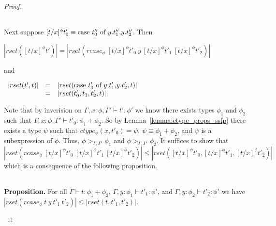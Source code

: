 \begin{proof}
\begin{itemize}
  \ \\
  Next suppose $[t/x]^\phi t'_0 \equiv \mbox{case}\ t''_0\ \text{of}\ y\text{.}t''_1\text{,}y\text{.}t''_2$.  Then 
  \begin{center}
    \begin{math}
      |rset([t/x]^\phi t')| = |rset(rcase_{\phi}\ [t/x]^\phi t'_0\ y\ [t/x]^\phi t'_1\ [t/x]^\phi t'_2)|
    \end{math}
  \end{center}
  and
  \begin{center}
    \begin{math}
      \begin{array}{lll}
        |rset(t', t)| & = & |rset(\mbox{case}\ t'_0\ \text{of}\ y\text{.}t'_1\text{,}y\text{.}t'_2, t)|\\
        & = & |rset(t'_0,t_1,t'_2,t)|.
      \end{array}
    \end{math}
  \end{center}
  Note that by inverision on $\Gamma,x:\phi,\Gamma' \vdash t':\phi'$ we know there exists
  types $\phi_1$ and $\phi_2$ such that $\Gamma,x:\phi,\Gamma' \vdash t'_0:\phi_1+\phi_2$.
  So by Lemma~\ref{lemma:ctype_props_ssfp} there exists a type $\psi$ such that $ctype_\phi (x,t'_0) = \psi$, $\psi \equiv \phi_1+\phi_2$, and $\psi$ is a 
  subexpression of $\phi$. Thus, $\phi >_{\Gamma,\Gamma'} \phi_1$ and $\phi >_{\Gamma,\Gamma'} \phi_2$.
  It suffices to show that $|rset(rcase_\phi\ [t/x]^\phi t'_0\ [t/x]^\phi t'_1\ [t/x]^\phi t'_2)| \leq |rset([t/x]^\phi t'_0, [t/x]^\phi t'_1, [t/x]^\phi t'_2)|$ which
  is a consequence of the following proposition.
    
  \ \\
  {\bf Proposition.}  For all $\Gamma \vdash t:\phi_1+\phi_2$, $\Gamma, y:\phi_1 \vdash t'_1:\phi'$, and 
  $\Gamma, y:\phi_2 \vdash t'_2:\phi'$ we have $|rset(rcase_{\phi}\ t\ y\ t'_1\ t'_2)| \leq |rset(t, t'_1, t'_2)|$.
    

\end{itemize}
\end{proof}
